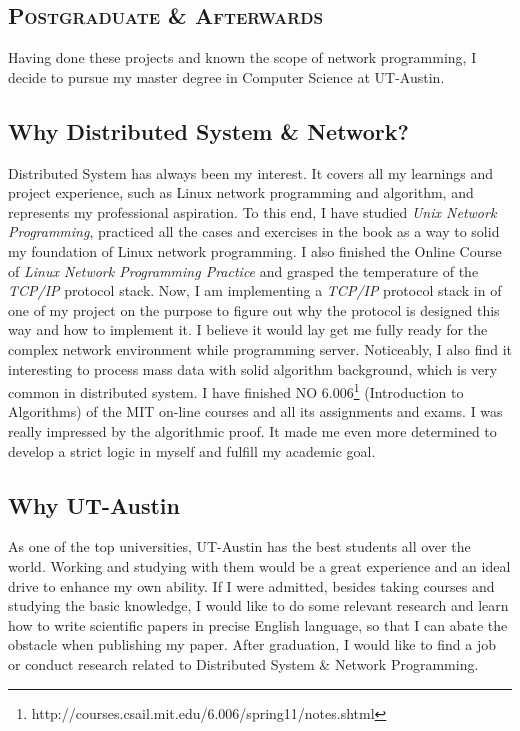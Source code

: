 \documentclass{article}
\begin{document}
\begin{multicols}{2}
		\section{\textsc{Postgraduate \& Afterwards}}
		Having done these projects and known the scope of network programming, I decide to pursue my master degree in Computer Science at UT-Austin.
		\subsection{Why Distributed System \& Network?}
		Distributed System has always been my interest. It covers all my learnings and project experience, such as Linux network programming and algorithm, and represents my professional aspiration. To this end, I have studied \textit{Unix Network Programming}, practiced all the cases and exercises in the book as a way to solid my foundation of Linux network programming. I also finished the Online Course of \textit{Linux Network Programming Practice} and grasped the temperature of the \textit{TCP/IP} protocol stack. Now, I am implementing a \textit{TCP/IP} protocol stack in of one of my project on the purpose to figure out why the protocol is designed this way and how to implement it. I believe it would lay get me fully ready for the complex network environment while programming server.
		Noticeably, I also find it interesting to process mass data with solid algorithm background, which is very common in distributed system. I have finished NO 6.006\footnote{http://courses.csail.mit.edu/6.006/spring11/notes.shtml} (Introduction to Algorithms) of the MIT on-line courses and all its assignments and exams. I was really impressed by the algorithmic proof. It made me even more determined to develop a strict logic in myself and fulfill my academic goal.
		\subsection{Why UT-Austin}
		As one of the top universities, UT-Austin has the best students all over the world. Working and studying with them would be a great experience and an ideal drive to enhance my own ability.
		If I were admitted, besides taking courses and studying the basic knowledge, I would like to do some relevant research and learn how to write scientific papers in precise English language, so that I can abate the obstacle when publishing my paper.
		After graduation, I would like to find a job or conduct research related to Distributed System \& Network Programming.
	\end{multicols}
\end{document}
